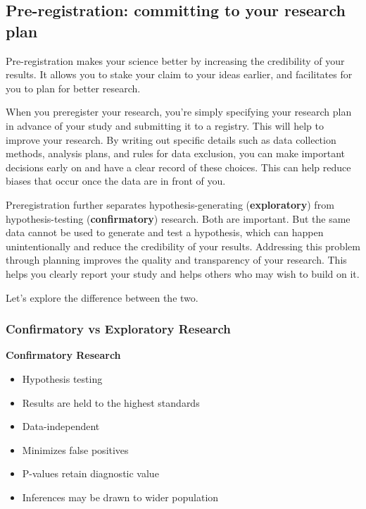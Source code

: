 \documentclass[
]{book}
\providecommand{\tightlist}{%
  \setlength{\itemsep}{0pt}\setlength{\parskip}{0pt}}
\begin{document}
\hypertarget{pre-registration-committing-to-your-research-plan}{%
\subsection{Pre-registration: committing to your research plan}\label{pre-registration-committing-to-your-research-plan}}

Pre-registration makes your science better by increasing the credibility of your results. It allows you to stake your claim to your ideas earlier, and facilitates for you to plan for better research.

When you preregister your research, you're simply specifying your research plan in advance of your study and submitting it to a registry. This will help to improve your research. By writing out specific details such as data collection methods, analysis plans, and rules for data exclusion, you can make important decisions early on and have a clear record of these choices. This can help reduce biases that occur once the data are in front of you.

Preregistration further separates hypothesis-generating (\textbf{exploratory}) from hypothesis-testing (\textbf{confirmatory}) research. Both are important. But the same data cannot be used to generate and test a hypothesis, which can happen unintentionally and reduce the credibility of your results. Addressing this problem through planning improves the quality and transparency of your research. This helps you clearly report your study and helps others who may wish to build on it.

Let's explore the difference between the two.

\hypertarget{confirmatory-vs-exploratory-research}{%
\subsubsection{Confirmatory vs Exploratory Research}\label{confirmatory-vs-exploratory-research}}

\textbf{Confirmatory Research}

\begin{itemize}
\tightlist
\item
  Hypothesis testing
\item
  Results are held to the highest standards
\item
  Data-independent
\item
  Minimizes false positives
\item
  P-values retain diagnostic value
\item
  Inferences may be drawn to wider population
\end{itemize}
\end{document}
